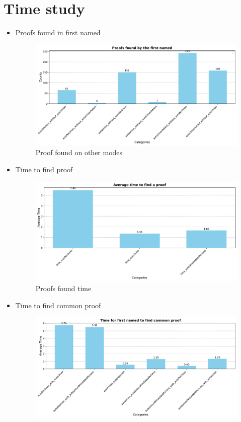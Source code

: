\documentclass[english,version-2020-11]{uzl-thesis}
\begin{document}
    \section{Time study}
      \begin{itemize}
        \item Proofs found in first named
          \begin{figure}[h!]
            \centering
            \includegraphics[width=\textwidth]{proof_found_difference.pdf} %
            \caption{Proof found on other modes}
            \label{fig:prover_found_different}
          \end{figure}
        \item Time to find proof
          \begin{figure}[h!]
            \centering
            \includegraphics[width=\textwidth]{time_to_find_proof.pdf} %
            \caption{Proofs found time}
            \label{fig:proof_time}
          \end{figure}
        \item Time to find common proof
          \begin{figure}[h!]
            \centering
            \includegraphics[width=\textwidth]{time_to_find_common_proof.pdf} %

\end{figure}
\end{itemize}
\end{document}
